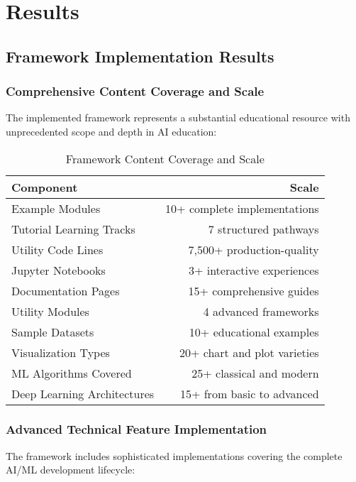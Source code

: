 \section{Results}
\label{sec:results}

\subsection{Framework Implementation Results}

\subsubsection{Comprehensive Content Coverage and Scale}

The implemented framework represents a substantial educational resource with unprecedented scope and depth in AI education:

\begin{table}[H]
\centering
\caption{Framework Content Coverage and Scale}
\label{tab:content-coverage}
\begin{tabular}{@{}lr@{}}
\toprule
\textbf{Component} & \textbf{Scale} \\
\midrule
Example Modules & 10+ complete implementations \\
Tutorial Learning Tracks & 7 structured pathways \\
Utility Code Lines & 7,500+ production-quality \\
Jupyter Notebooks & 3+ interactive experiences \\
Documentation Pages & 15+ comprehensive guides \\
Utility Modules & 4 advanced frameworks \\
Sample Datasets & 10+ educational examples \\
Visualization Types & 20+ chart and plot varieties \\
ML Algorithms Covered & 25+ classical and modern \\
Deep Learning Architectures & 15+ from basic to advanced \\
\bottomrule
\end{tabular}
\end{table}

\subsubsection{Advanced Technical Feature Implementation}

The framework includes sophisticated implementations covering the complete AI/ML development lifecycle:

